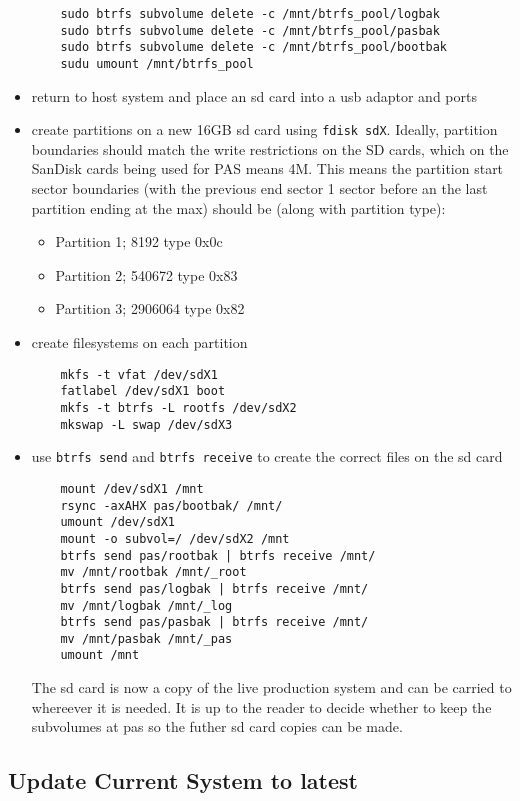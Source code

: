 \documentclass[Draft]{akc}
\begin{document}
\begin{itemize}
\begin{lstlisting}
    sudo btrfs subvolume delete -c /mnt/btrfs_pool/logbak
    sudo btrfs subvolume delete -c /mnt/btrfs_pool/pasbak
    sudo btrfs subvolume delete -c /mnt/btrfs_pool/bootbak
    sudu umount /mnt/btrfs_pool
  \end{lstlisting}
  \item return to host system and place an sd card into a usb adaptor and ports
  \item create partitions on a new 16GB sd card using \texttt{fdisk sdX}.  Ideally, partition boundaries should
  match the write restrictions on the SD cards, which on the SanDisk cards being used for PAS means 4M.  This means the
  partition start sector boundaries (with the previous end sector 1 sector before an the last partition ending at the max) should be (along with partition type):
  \begin{itemize}
    \item Partition 1; 8192 type 0x0c
    \item Partition 2; 540672 type 0x83
    \item Partition 3; 2906064 type 0x82
  \end{itemize}
  \item create filesystems on each partition
  \begin{lstlisting}
    mkfs -t vfat /dev/sdX1
    fatlabel /dev/sdX1 boot
    mkfs -t btrfs -L rootfs /dev/sdX2
    mkswap -L swap /dev/sdX3
  \end{lstlisting}
  \item use \texttt{btrfs send} and \texttt{btrfs receive} to create the correct files on the sd card
  \begin{lstlisting}
    mount /dev/sdX1 /mnt
    rsync -axAHX pas/bootbak/ /mnt/
    umount /dev/sdX1
    mount -o subvol=/ /dev/sdX2 /mnt
    btrfs send pas/rootbak | btrfs receive /mnt/
    mv /mnt/rootbak /mnt/_root
    btrfs send pas/logbak | btrfs receive /mnt/
    mv /mnt/logbak /mnt/_log
    btrfs send pas/pasbak | btrfs receive /mnt/
    mv /mnt/pasbak /mnt/_pas
    umount /mnt
  \end{lstlisting}
  The sd card is now a copy of the live production system and can be carried to whereever it is needed.  It is up to the
  reader to decide whether to keep the subvolumes at pas so the futher sd card copies can be made.
\end{itemize}

\subsection{Update Current System to latest}
\end{document}
